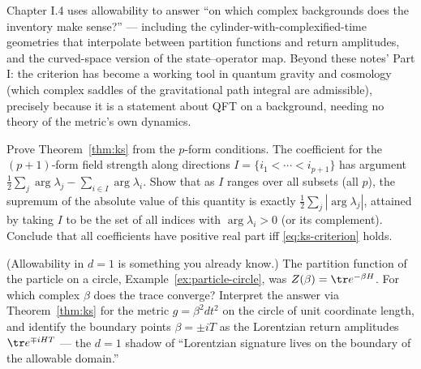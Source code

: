 \begin{ppreview}
Chapter I.4 uses allowability to answer ``on which complex backgrounds does
the inventory make sense?'' --- including the cylinder-with-complexified-time
geometries that interpolate between partition functions and return amplitudes,
and the curved-space version of the state--operator map. Beyond these notes'
Part I: the criterion has become a working tool in quantum gravity and
cosmology (which complex saddles of the gravitational path integral are
admissible), precisely because it is a statement about QFT on a background,
needing no theory of the metric's own dynamics.
\end{ppreview}

\begin{exercise}[medium]
\label{exr:ks-worst}
Prove Theorem~\ref{thm:ks} from the $p$-form conditions. The coefficient for
the $(p+1)$-form field strength along directions $I = \{i_1 < \cdots <
i_{p+1}\}$ has argument $\frac12\sum_j \arg\lambda_j - \sum_{i \in I}
\arg\lambda_i$. Show that as $I$ ranges over all subsets (all $p$), the
supremum of the absolute value of this quantity is exactly
$\frac12\sum_j|\arg\lambda_j|$, attained by taking $I$ to be the set of all
indices with $\arg \lambda_i > 0$ (or its complement). Conclude that all
coefficients have positive real part iff \eqref{eq:ks-criterion} holds.
\end{exercise}

\begin{exercise}[easy]
\label{exr:complex-beta}
(Allowability in $d=1$ is something you already know.) The partition function
of the particle on a circle, Example~\ref{ex:particle-circle}, was $Z(\beta) =
\tr e^{-\beta H}$. For which complex $\beta$ does the trace converge?
Interpret the answer via Theorem~\ref{thm:ks} for the metric $g = \beta^2
dt^2$ on the circle of unit coordinate length, and identify the boundary
points $\beta = \pm i T$ as the Lorentzian return amplitudes $\tr
e^{\mp iHT}$ --- the $d=1$ shadow of ``Lorentzian signature lives on the
boundary of the allowable domain.''
\end{exercise}

